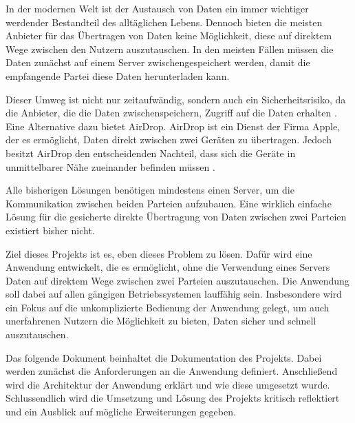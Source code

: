 In der modernen Welt ist der Austausch von Daten ein immer wichtiger werdender Bestandteil des alltäglichen Lebens. Dennoch bieten die meisten Anbieter für das Übertragen von Daten keine Möglichkeit, diese auf direktem Wege zwischen den Nutzern auszutauschen. In den meisten Fällen müssen die Daten zunächst auf einem Server zwischengespeichert werden, damit die empfangende Partei diese Daten herunterladen kann.

Dieser Umweg ist nicht nur zeitaufwändig, sondern auch ein Sicherheitsrisiko, da die Anbieter, die die Daten zwischenspeichern, Zugriff auf die Daten erhalten \cite{bsi-cloud}. Eine Alternative dazu bietet AirDrop. AirDrop ist ein Dienst der Firma Apple, der es ermöglicht, Daten direkt zwischen zwei Geräten zu übertragen. Jedoch besitzt AirDrop den entscheidenden Nachteil, dass sich die Geräte in unmittelbarer Nähe zueinander befinden müssen \cite{apple-airdrop}.

Alle bisherigen Lösungen benötigen mindestens einen Server, um die Kommunikation zwischen beiden Parteien aufzubauen. Eine wirklich einfache Lösung für die gesicherte direkte Übertragung von Daten zwischen zwei Parteien existiert bisher nicht.

Ziel dieses Projekts ist es, eben dieses Problem zu lösen. Dafür wird eine Anwendung entwickelt, die es ermöglicht, ohne die Verwendung eines Servers Daten auf direktem Wege zwischen zwei Parteien auszutauschen. Die Anwendung soll dabei auf allen gängigen Betriebssystemen lauffähig sein. Insbesondere wird ein Fokus auf die unkomplizierte Bedienung der Anwendung gelegt, um auch unerfahrenen Nutzern die Möglichkeit zu bieten, Daten sicher und schnell auszutauschen.

Das folgende Dokument beinhaltet die Dokumentation des Projekts. Dabei werden zunächst die Anforderungen an die Anwendung definiert. Anschließend wird die Architektur der Anwendung erklärt und wie diese umgesetzt wurde. Schlussendlich wird die Umsetzung und Lösung des Projekts kritisch reflektiert und ein Ausblick auf mögliche Erweiterungen gegeben.
